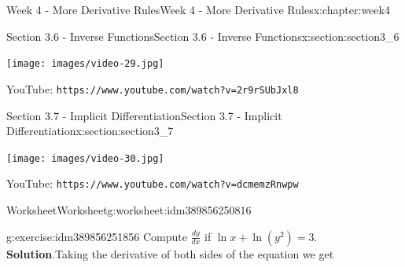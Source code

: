 \documentclass[oneside,10pt,]{book}
\newcommand{\blocktitlefont}{\relax}
\newcommand{\mono}[1]{\texttt{#1}}
\numberwithin{equation}{section}
\newlength{\qrsize}
\newlength{\previewwidth}
\begin{document}
\begin{chapterptx}{Week 4 - More Derivative Rules}{}{Week 4 - More Derivative Rules}{}{}{x:chapter:week4}
\begin{sectionptx}{Section 3.6 - Inverse Functions}{}{Section 3.6 - Inverse Functions}{}{}{x:section:section3_6}
\begin{tcbraster}[raster columns=2, raster column skip=1pt, raster halign=center, raster force size=false, raster left skip=0pt, raster right skip=0pt]
\begin{tcolorbox}[previewstyle, width=\previewwidth]%
\texttt{[image: images/video-29.jpg]}%
\end{tcolorbox}%
\begin{tcolorbox}[qrstyle]%
{\hypersetup{urlcolor=black}}%
\end{tcolorbox}%
\begin{tcolorbox}[captionstyle]%
\small YouTube: \mono{https://www.youtube.com/watch?v=2r9rSUbJxl8}\end{tcolorbox}%
\end{tcbraster}%
\end{sectionptx}
%
%
\typeout{************************************************}
\typeout{************************************************}
%
\begin{sectionptx}{Section 3.7 - Implicit Differentiation}{}{Section 3.7 - Implicit Differentiation}{}{}{x:section:section3_7}
\setlength{\qrsize}{9em}
\setlength{\previewwidth}{\linewidth}
\addtolength{\previewwidth}{-\qrsize}
\begin{tcbraster}[raster columns=2, raster column skip=1pt, raster halign=center, raster force size=false, raster left skip=0pt, raster right skip=0pt]%
\begin{tcolorbox}[previewstyle, width=\previewwidth]%
\texttt{[image: images/video-30.jpg]}%
\end{tcolorbox}%
\begin{tcolorbox}[qrstyle]%
{\hypersetup{urlcolor=black}}%
\end{tcolorbox}%
\begin{tcolorbox}[captionstyle]%
\small YouTube: \mono{https://www.youtube.com/watch?v=dcmemzRnwpw}\end{tcolorbox}%
\end{tcbraster}%
%
%
\typeout{************************************************}
\typeout{************************************************}
%
\begin{worksheet-subsection}{Worksheet}{}{Worksheet}{}{}{g:worksheet:idm389856250816}
\begin{divisionexercise}{1}{}{}{g:exercise:idm389856251856}%
Compute \(\frac{dy}{dx}\) if \(\ln x + \ln (y^2) = 3\).%
\textbf{\blocktitlefont Solution}.\hypertarget{g:solution:idm389856255680}{}\quad{}Taking the derivative of both sides of the equation we get%

\end{divisionexercise}
\end{worksheet-subsection}
\end{sectionptx}
\end{chapterptx}
\end{document}
